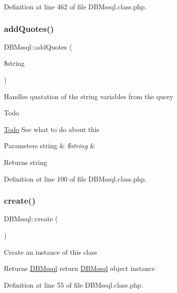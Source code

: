Definition at line 462 of file D\+B\+Mssql.\+class.\+php.

\hypertarget{classDBMssql_ac380f1918abd17fd5cba28accfaec9fc}{}\label{classDBMssql_ac380f1918abd17fd5cba28accfaec9fc} 
\subsubsection{\texorpdfstring{add\+Quotes()}{addQuotes()}}
{\footnotesize\ttfamily D\+B\+Mssql\+::add\+Quotes (\begin{DoxyParamCaption}\item[{}]{\$string }\end{DoxyParamCaption})}

Handles quatation of the string variables from the query \begin{DoxyRefDesc}{Todo}
\item[\hyperlink{todo__todo000001}{Todo}]See what to do about this \end{DoxyRefDesc}

\begin{DoxyParams}[1]{Parameters}
string & {\em \$string} & \\
\hline
\end{DoxyParams}
\begin{DoxyReturn}{Returns}
string 
\end{DoxyReturn}


Definition at line 100 of file D\+B\+Mssql.\+class.\+php.

\hypertarget{classDBMssql_a1be3ce3432e43e0a5080ada450971345}{}\label{classDBMssql_a1be3ce3432e43e0a5080ada450971345} 
\subsubsection{\texorpdfstring{create()}{create()}}
{\footnotesize\ttfamily D\+B\+Mssql\+::create (\begin{DoxyParamCaption}{ }\end{DoxyParamCaption})}

Create an instance of this class \begin{DoxyReturn}{Returns}
\hyperlink{classDBMssql}{D\+B\+Mssql} return \hyperlink{classDBMssql}{D\+B\+Mssql} object instance 
\end{DoxyReturn}


Definition at line 55 of file D\+B\+Mssql.\+class.\+php.

